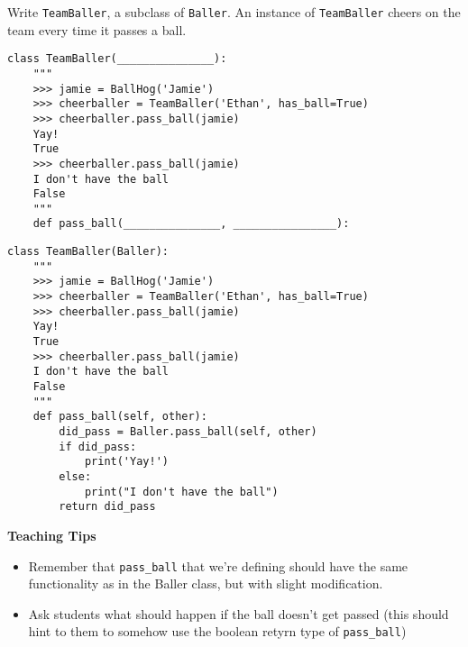 \begin{blocksection}
\question Write \lstinline$TeamBaller$, a subclass of \lstinline$Baller$. An instance of \lstinline$TeamBaller$ cheers on the team every time it passes a ball.

\ifprintanswers\else
\begin{lstlisting}
class TeamBaller(_______________):
    """
    >>> jamie = BallHog('Jamie')
    >>> cheerballer = TeamBaller('Ethan', has_ball=True)
    >>> cheerballer.pass_ball(jamie)
    Yay!
    True
    >>> cheerballer.pass_ball(jamie)
    I don't have the ball
    False
    """
    def pass_ball(_______________, ________________):
\end{lstlisting}
\fi

\begin{solution}[1in]
\begin{lstlisting}
class TeamBaller(Baller):
    """
    >>> jamie = BallHog('Jamie')
    >>> cheerballer = TeamBaller('Ethan', has_ball=True)
    >>> cheerballer.pass_ball(jamie)
    Yay!
    True
    >>> cheerballer.pass_ball(jamie)
    I don't have the ball
    False
    """
    def pass_ball(self, other):
        did_pass = Baller.pass_ball(self, other)
        if did_pass:
            print('Yay!')
        else:
            print("I don't have the ball")
        return did_pass
\end{lstlisting}
\end{solution}

\begin{guide}
\textbf{Teaching Tips}
\begin{itemize}
  \item Remember that \lstinline{pass_ball} that we're defining should have the same functionality as in the Baller class, but with slight modification.
  \item Ask students what should happen if the ball doesn't get passed (this should hint to them to somehow use the boolean retyrn type of \lstinline{pass_ball})
\end{itemize}
\end{guide}
\end{blocksection}
